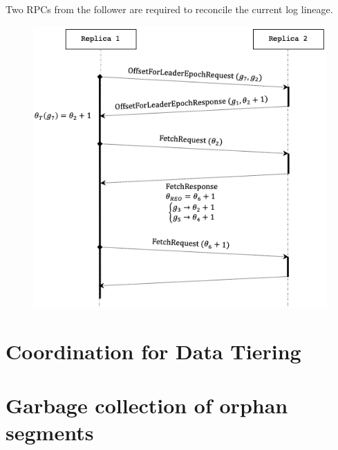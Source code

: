 \documentclass{article}
\begin{document}
Two RPCs from the follower are required to reconcile the current log lineage.

\begin{figure}[H]
	\centering
	\includegraphics[scale=0.5]{RPCs.png}
	\label{fig:rpc}
\end{figure}


\newpage
\section{Coordination for Data Tiering}

\newpage
\section{Garbage collection of orphan segments}

\newpage

{}
\end{document}
